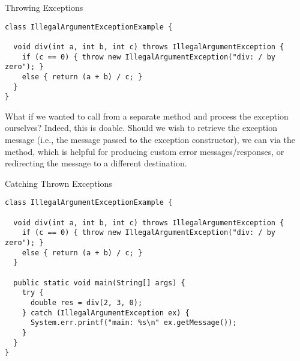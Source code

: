 \begin{cl}[]{Throwing Exceptions} 
\begin{lstlisting}[language=MyJava]
class IllegalArgumentExceptionExample {
  
  void div(int a, int b, int c) throws IllegalArgumentException {
    if (c == 0) { throw new IllegalArgumentException("div: / by zero"); }
    else { return (a + b) / c; }
  }
}
\end{lstlisting}
\end{cl}

What if we wanted to call  from a separate method and process the exception ourselves? Indeed, this is doable. Should we wish to retrieve the exception message (i.e., the message passed to the exception constructor), we can via the  method, which is helpful for producing custom error messages/responses, or redirecting the message to a different destination.

\begin{cl}[]{Catching Thrown Exceptions}
\begin{lstlisting}[language=MyJava]
class IllegalArgumentExceptionExample {
  
  void div(int a, int b, int c) throws IllegalArgumentException {
    if (c == 0) { throw new IllegalArgumentException("div: / by zero"); }
    else { return (a + b) / c; }
  }

  public static void main(String[] args) {
    try {
      double res = div(2, 3, 0);
    } catch (IllegalArgumentException ex) {
      System.err.printf("main: %s\n" ex.getMessage());
    }
  }
}
\end{lstlisting}
\end{cl}


